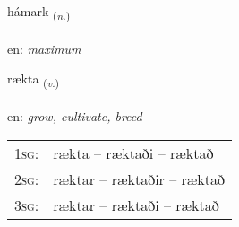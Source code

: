 \documentclass[frontgrid, backgrid]{flacards}\usepackage[]{graphicx}\usepackage[]{xcolor}
\begin{document}
\renewcommand{\flhead}{\vskip5pt \fboxsep=0pt {\small\bfseries\footnotesize Nafnorð | Noun}}
\renewcommand{\fcfoot}{\vskip5pt \fboxsep=0pt \hspace{2pt}{\small\bfseries\footnotesize 3K}}

\renewcommand{\blhead}{\vskip5pt {\small\bfseries\footnotesize Nafnorð | Noun }}
\renewcommand{\bcfoot}{\vskip5pt \hspace{2pt}{\small\bfseries\footnotesize 3K}}


{hámark \small{\textsubscript{(\textit{n.})}} \\[1ex] %
\textphonetic{[hauːmar̥k]} \\
en: \emph{maximum} \\  [2ex]
\renewcommand*{\arraystretch}{0.8}
}

\renewcommand{\flhead}{\vskip5pt \fboxsep=0pt {\small\bfseries\footnotesize Sagnorð | Verb}}
\renewcommand{\fcfoot}{\vskip5pt \fboxsep=0pt \hspace{2pt}{\small\bfseries\footnotesize 3K}}

\renewcommand{\blhead}{\vskip5pt {\small\bfseries\footnotesize Sagnorð | Verb }}
\renewcommand{\bcfoot}{\vskip5pt \hspace{2pt}{\small\bfseries\footnotesize 3K}}


{rækta \small{\textsubscript{(\textit{v.})}} \\[1ex] %
\textphonetic{[raixta]} \\
en: \emph{grow, cultivate, breed} \\  [2ex]
\renewcommand*{\arraystretch}{0.8}
\begin{tabular}{p{1cm}l}
\textsc{1sg}: & rækta -- ræktaði -- ræktað \\ 
\textsc{2sg}: & ræktar -- ræktaðir -- ræktað \\ 
\textsc{3sg}: & ræktar -- ræktaði -- ræktað \\ 
\end{tabular}
}
\end{document}
